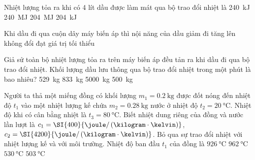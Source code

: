 \begin{ex}
	Nhiệt lượng tỏa ra khi có 4 lít dầu được làm mát qua bộ trao đổi nhiệt là
	\choice
	{\SI{240}{\kilo\joule}}
	{\SI{240}{\mega\joule}}
	{\SI{204}{\mega\joule}}
	{\True \SI{204}{\kilo\joule}}
	\loigiai{}
\end{ex}
\begin{ex}
	Khi dầu đi qua cuộn dây máy biến áp thì nội năng của dầu
	\choice
	{giảm đi}
	{\True tăng lên}
	{không đổi}
	{đạt giá trị tối thiểu}
	\loigiai{}
\end{ex}
\begin{ex}
	Giả sử toàn bộ nhiệt lượng tỏa ra trên máy biến áp đều tản ra khi dầu đi qua bộ trao đổi nhiệt. Khối lượng dầu lưu thông qua bộ trao đổi nhiệt trong một phút là bao nhiêu?
	\choice
	{\SI{529}{\kilogram}}
	{\SI{833}{\kilogram}}
	{\SI{5000}{\kilogram}}
	{\True \SI{500}{\kilogram}}
	\loigiai{}
\end{ex}
\begin{ex}
	Người ta thả một miếng đồng có khối lượng $m_1=\SI{0.2}{\kilogram}$ được đốt nóng đến nhiệt độ $t_1$ vào một nhiệt lượng kế chứa $m_2=\SI{0.28}{\kilogram}$ nước ở nhiệt độ $t_2=\SI{20}{\celsius}$. Nhiệt độ khi có cân bằng nhiệt là $t_3=\SI{80}{\celsius}$. Biết nhiệt dung riêng của đồng và nước lần lượt là $c_1=\SI{400}{\joule/\left(\kilogram\cdot\kelvin\right)}$, $c_2=\SI{4200}{\joule/\left(\kilogram\cdot\kelvin\right)}$. Bỏ qua sự trao đổi nhiệt với nhiệt lượng kế và với môi trường. Nhiệt độ ban đầu $t_1$ của đồng là
	\choice
	{$\SI{926}{\celsius}$}
	{\True $\SI{962}{\celsius}$}
	{$\SI{530}{\celsius}$}
	{$\SI{503}{\celsius}$}
\end{ex}

